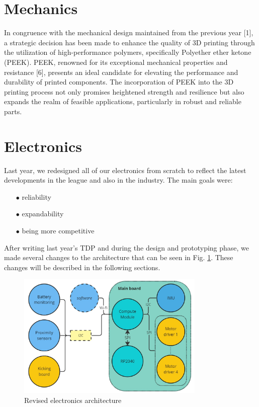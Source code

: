 \documentclass[runningheads]{llncs}
\begin{document}
\section {Mechanics}
In congruence with the mechanical design maintained from the previous year [1], a strategic decision has been made to enhance the quality of 3D printing through the utilization of high-performance polymers, specifically Polyether ether ketone (PEEK). PEEK, renowned for its exceptional mechanical properties and resistance [6], presents an ideal candidate for elevating the performance and durability of printed components. The incorporation of PEEK into the 3D printing process not only promises heightened strength and resilience but also expands the realm of feasible applications, particularly in robust and reliable parts.

\section{Electronics}

\indent Last year, we redesigned all of our electronics from scratch to reflect the latest developments in the league and also in the industry. The main goals were:

\begin{enumerate}
    \item[$\bullet$] reliability
    \item[$\bullet$] expandability
    \item[$\bullet$] being more competitive
\end{enumerate}

After writing last year's TDP and during the design and prototyping phase, we made several changes to the architecture that can be seen in Fig. \ref{fig:electronics-architecture}. These changes will be described in the following sections.

\begin{figure}
	\centering
	\includegraphics[width=0.8\textwidth]{images/electronics-architecture.jpg}
	\caption{Revised electronics architecture}
	\label{fig:electronics-architecture}
\end{figure}
\end{document}
